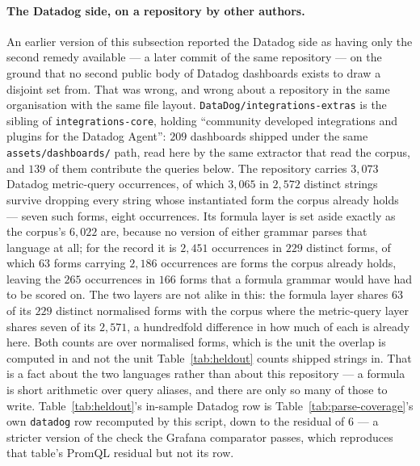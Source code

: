 \paragraph{The Datadog side, on a repository by other authors.}
An earlier version of this subsection reported the Datadog side as having only the second
remedy available --- a later commit of the same repository --- on the ground that no
second public body of Datadog dashboards exists to draw a disjoint set from. That was
wrong, and wrong about a repository in the same organisation with the same file layout.
\texttt{DataDog/integrations-extras} is the sibling of \texttt{integrations-core},
holding ``community developed integrations and plugins for the Datadog Agent'': $209$
dashboards shipped under the same \texttt{assets/dashboards/} path, read here by the same
extractor that read the corpus, and $139$ of them contribute the queries below. The
repository carries $3{,}073$ Datadog metric-query occurrences, of which $3{,}065$ in
$2{,}572$ distinct strings survive dropping every string whose instantiated form the
corpus already holds --- seven such forms, eight occurrences. Its formula layer is set
aside exactly as the corpus's $6{,}022$ are, because no version of either grammar parses
that language at all; for the record it is $2{,}451$ occurrences in $229$ distinct forms,
of which $63$ forms carrying $2{,}186$ occurrences are forms the corpus already holds,
leaving the $265$ occurrences in $166$ forms that a formula grammar would have had to be
scored on. The two layers are not alike in this: the formula layer shares $63$ of its
$229$ distinct normalised forms with the corpus where the metric-query layer shares
seven of its $2{,}571$, a hundredfold difference in how much of each is already here.
Both counts are over normalised forms, which is the unit the overlap is computed in and
not the unit Table~\ref{tab:heldout} counts shipped strings in. That is a fact about the
two languages rather than about this repository --- a formula is short arithmetic over
query aliases, and there are only so many of those to write.
Table~\ref{tab:heldout}'s in-sample Datadog row is Table~\ref{tab:parse-coverage}'s own
\texttt{datadog} row recomputed by this script, down to the residual of $6$ --- a
stricter version of the check the Grafana comparator passes, which reproduces that
table's PromQL residual but not its row.


